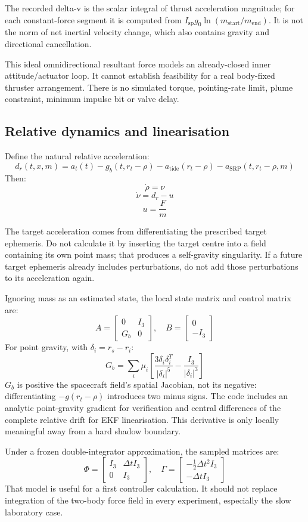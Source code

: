 \documentclass[11pt,a4paper]{article}
\begin{document}
The recorded delta-v is the scalar integral of thrust acceleration magnitude; for each constant-force segment it is computed from $I_{\mathrm{sp}} g_0 \ln(m_{\mathrm{start}}/m_{\mathrm{end}})$. It is not the norm of net inertial velocity change, which also contains gravity and directional cancellation.

This ideal omnidirectional resultant force models an already-closed inner attitude/actuator loop. It cannot establish feasibility for a real body-fixed thruster arrangement. There is no simulated torque, pointing-rate limit, plume constraint, minimum impulse bit or valve delay.

\subsection{Relative dynamics and linearisation}
Define the natural relative acceleration:
\[ d_{r}(t, x, m) = a_{t}(t) - g_{b}(t, r_{t} - \rho) - a_{\mathrm{tide}}(r_{t} - \rho) - a_{\mathrm{SRP}}(t, r_{t} - \rho, m) \]
Then:
\[ \dot{\rho} = \nu \]
\[ \dot{\nu} = d_{r} - u \]
\[ u = \frac{F}{m} \]

The target acceleration comes from differentiating the prescribed target ephemeris. Do not calculate it by inserting the target centre into a field containing its own point mass; that produces a self-gravity singularity. If a future target ephemeris already includes perturbations, do not add those perturbations to its acceleration again.

Ignoring mass as an estimated state, the local state matrix and control matrix are:
\[ A = \begin{bmatrix} 0 & I_{3} \\ G_b & 0 \end{bmatrix}, \quad B = \begin{bmatrix} 0 \\ -I_{3} \end{bmatrix} \]
For point gravity, with $\delta_{i} = r_{s} - r_{i}$:
\[ G_{b} = \sum_{i} \mu_{i} \left[ \frac{3 \delta_{i} \delta_{i}^{T}}{|\delta_{i}|^{5}} - \frac{I_{3}}{|\delta_{i}|^{3}} \right] \]
$G_b$ is positive the spacecraft field's spatial Jacobian, not its negative: differentiating $-g(r_t - \rho)$ introduces two minus signs. The code includes an analytic point-gravity gradient for verification and central differences of the complete relative drift for EKF linearisation. This derivative is only locally meaningful away from a hard shadow boundary.

Under a frozen double-integrator approximation, the sampled matrices are:
\[ \Phi = \begin{bmatrix} I_{3} & \Delta t I_{3} \\ 0 & I_{3} \end{bmatrix}, \quad \Gamma = \begin{bmatrix} -\frac{1}{2} \Delta t^{2} I_{3} \\ -\Delta t I_{3} \end{bmatrix} \]
That model is useful for a first controller calculation. It should not replace integration of the two-body force field in every experiment, especially the slow laboratory case.
\end{document}
